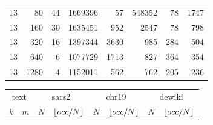 \begin{table}[p]
\begin{minipage}[c]{0.49\textwidth}
\begin{tabular}{|rr|rr|rr|rr|}
\num{13} &   \num{80} & \num{44} & \num{1669396} &   \num{57} &  \num{548352} &  \num{78} &     \num{1747} \\
\num{13} &  \num{160} & \num{30} & \num{1635451} &  \num{952} &    \num{2547} &  \num{78} &      \num{798} \\
\num{13} &  \num{320} & \num{16} & \num{1397344} & \num{3630} &     \num{985} & \num{284} &      \num{504} \\
\num{13} &  \num{640} &  \num{6} & \num{1077729} & \num{1713} &     \num{827} & \num{364} &      \num{354} \\
\num{13} & \num{1280} &  \num{4} & \num{1152011} &  \num{562} &     \num{762} & \num{205} &      \num{236} \\
\hline
\end{tabular}
\label{tab:patterns_locate_apm_ham}
\end{minipage}
\hfill
\begin{minipage}[c]{0.49\textwidth}
\centering
\fontsize{6.5pt}{7.6pt}\selectfont
\setlength{\tabcolsep}{2pt}
\renewcommand{\arraystretch}{1.18}
\begin{tabular}{|rr|rr|rr|rr|}
\hline
\multicolumn{2}{|c|}{text}
& \multicolumn{2}{c|}{sars2}
& \multicolumn{2}{c|}{chr19}
& \multicolumn{2}{c|}{dewiki} \\
$k$ & $m$
& $N$ & $\lfloor occ/N \rfloor$
& $N$ & $\lfloor occ/N \rfloor$
& $N$ & $\lfloor occ/N \rfloor$ \\
\hline

\end{tabular}
\end{minipage}
\end{table}
